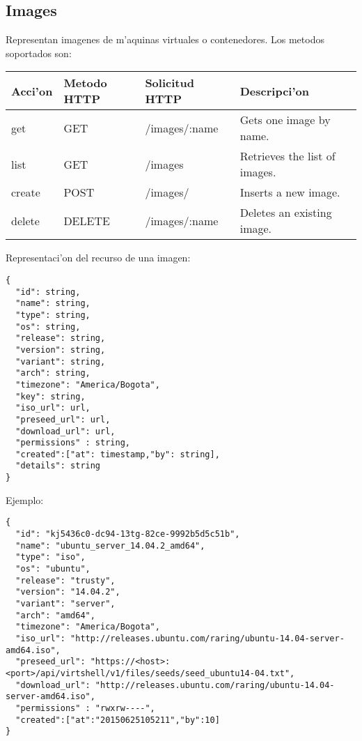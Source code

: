 \subsection{Images}
Representan imagenes de m'aquinas virtuales o contenedores. Los metodos soportados son:

\begin{center}
 \begin{tabular}{| l | l | l | l |}
 \hline
  \rowcolor{blueapi}
  \textbf{Acci'on} & \textbf{Metodo HTTP} & \textbf{Solicitud HTTP} & \textbf{Descripci'on} \\ [0.5ex] 
  \hline\hline
  get & GET & /images/:name & Gets one image by name. \\
  \hline
  list & GET & /images & Retrieves the list of images. \\
  \hline  
  create & POST & /images/ & Inserts a new image. \\
  \hline
  delete & DELETE & /images/:name & Deletes an existing image. \\ [1ex] 
  \hline
\end{tabular}
\end{center}

\vspace{1cm}
Representaci'on del recurso de una imagen:
\vspace{1cm}

\begin{lstlisting}[style=json]
{
  "id": string,
  "name": string,
  "type": string,
  "os": string, 
  "release": string,
  "version": string, 
  "variant": string, 
  "arch": string, 
  "timezone": "America/Bogota", 
  "key": string,
  "iso_url": url,
  "preseed_url": url,
  "download_url": url,
  "permissions" : string,
  "created":["at": timestamp,"by": string],
  "details": string
}
\end{lstlisting}

Ejemplo:

\medskip
\begin{lstlisting}[style=json]
{
  "id": "kj5436c0-dc94-13tg-82ce-9992b5d5c51b",
  "name": "ubuntu_server_14.04.2_amd64",
  "type": "iso",
  "os": "ubuntu", 
  "release": "trusty",
  "version": "14.04.2", 
  "variant": "server", 
  "arch": "amd64", 
  "timezone": "America/Bogota",
  "iso_url": "http://releases.ubuntu.com/raring/ubuntu-14.04-server-amd64.iso",
  "preseed_url": "https://<host>:<port>/api/virtshell/v1/files/seeds/seed_ubuntu14-04.txt",
  "download_url": "http://releases.ubuntu.com/raring/ubuntu-14.04-server-amd64.iso",
  "permissions" : "rwxrw----",
  "created":["at":"20150625105211","by":10]
}
\end{lstlisting}

